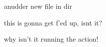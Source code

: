 \documentclass{article}
\begin{document}
anudder new file in dir

this is gonna get f'ed up, isnt it?

why isn't it running the action!
\end{document}
